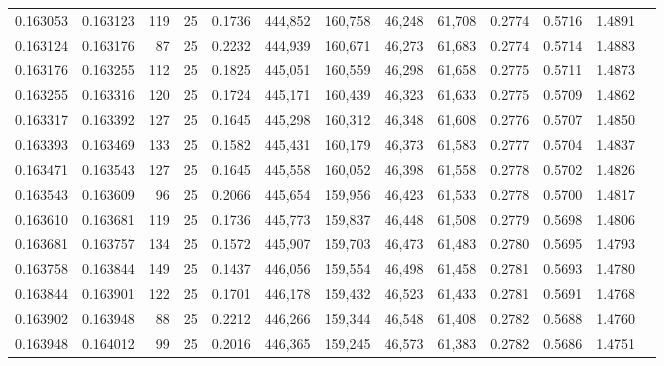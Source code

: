 \begin{tabular}{rrrrrrrrrrrrr}
0.163053 & 0.163123 &   119 &  25 &                                     0.1736 & 444,852 & 160,758 &  46,248 &  61,708 & 0.2774 & 0.5716 & 1.4891 \\
0.163124 & 0.163176 &    87 &  25 &                                     0.2232 & 444,939 & 160,671 &  46,273 &  61,683 & 0.2774 & 0.5714 & 1.4883 \\
0.163176 & 0.163255 &   112 &  25 &                                     0.1825 & 445,051 & 160,559 &  46,298 &  61,658 & 0.2775 & 0.5711 & 1.4873 \\
0.163255 & 0.163316 &   120 &  25 &                                     0.1724 & 445,171 & 160,439 &  46,323 &  61,633 & 0.2775 & 0.5709 & 1.4862 \\
0.163317 & 0.163392 &   127 &  25 &                                     0.1645 & 445,298 & 160,312 &  46,348 &  61,608 & 0.2776 & 0.5707 & 1.4850 \\
0.163393 & 0.163469 &   133 &  25 &                                     0.1582 & 445,431 & 160,179 &  46,373 &  61,583 & 0.2777 & 0.5704 & 1.4837 \\
0.163471 & 0.163543 &   127 &  25 &                                     0.1645 & 445,558 & 160,052 &  46,398 &  61,558 & 0.2778 & 0.5702 & 1.4826 \\
0.163543 & 0.163609 &    96 &  25 &                                     0.2066 & 445,654 & 159,956 &  46,423 &  61,533 & 0.2778 & 0.5700 & 1.4817 \\
0.163610 & 0.163681 &   119 &  25 &                                     0.1736 & 445,773 & 159,837 &  46,448 &  61,508 & 0.2779 & 0.5698 & 1.4806 \\
0.163681 & 0.163757 &   134 &  25 &                                     0.1572 & 445,907 & 159,703 &  46,473 &  61,483 & 0.2780 & 0.5695 & 1.4793 \\
0.163758 & 0.163844 &   149 &  25 &                                     0.1437 & 446,056 & 159,554 &  46,498 &  61,458 & 0.2781 & 0.5693 & 1.4780 \\
0.163844 & 0.163901 &   122 &  25 &                                     0.1701 & 446,178 & 159,432 &  46,523 &  61,433 & 0.2781 & 0.5691 & 1.4768 \\
0.163902 & 0.163948 &    88 &  25 &                                     0.2212 & 446,266 & 159,344 &  46,548 &  61,408 & 0.2782 & 0.5688 & 1.4760 \\
0.163948 & 0.164012 &    99 &  25 &                                     0.2016 & 446,365 & 159,245 &  46,573 &  61,383 & 0.2782 & 0.5686 & 1.4751 \\

\end{tabular}
